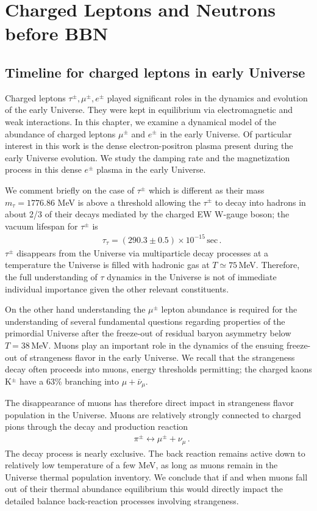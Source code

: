 \section{Charged Leptons and Neutrons before BBN} 
\subsection{Timeline for charged leptons in early Universe}\label{Electron}
Charged leptons $\tau^\pm,\mu^\pm,e^\pm$ played significant roles in the dynamics and evolution of the early Universe. They were kept in equilibrium via electromagnetic and weak interactions.  In this chapter, we examine a dynamical model of the abundance of charged leptons $\mu^\pm$ and $e^\pm$ in the early Universe.  Of particular interest in this work is the dense electron-positron plasma present during the early Universe evolution. We study the damping rate and the magnetization process in this dense $e^\pm$ plasma in the early Universe.

We comment briefly on the case of $\tau^\pm$ which is different as their mass $m_\tau=1776.86$ MeV is above a threshold allowing the $\tau^\pm$ to decay into hadrons in about 2/3 of their decays mediated by the charged EW  W-gauge boson; the vacuum lifespan for $\tau^\pm$ is~\cite{ParticleDataGroup:2022pth}
\begin{align}
&\tau_{\tau}=(290.3\pm0.5)\times10^{-15}\,\mathrm{sec}\,.
\end{align}
$\tau^\pm$ disappears from the Universe via multiparticle decay processes at a temperature the Universe is filled with hadronic gas at $T\simeq 75$\,MeV. Therefore, the full understanding of $\tau$ dynamics in the Universe is not of immediate individual importance given the other relevant constituents.

On the other hand understanding the $\mu^\pm$ lepton abundance is required for the understanding of several fundamental questions regarding properties of the primordial Universe after the freeze-out of residual baryon asymmetry below $T=38$\,MeV. Muons play an important role in the dynamics of the ensuing freeze-out of strangeness flavor in the early Universe. We recall that the strangeness decay often proceeds into muons, energy thresholds permitting;  the charged kaons K$^\pm$ have a 63\% branching into $\mu+\bar \nu_\mu$. 

The disappearance of muons has therefore direct impact in strangeness flavor population in the Universe. Muons are relatively strongly connected to charged pions through the decay and production reaction 
\begin{align}
&\pi^\pm\leftrightarrow \mu^\pm+\nu_\mu\,.
\end{align}
The decay process is nearly exclusive. The back reaction remains active down to relatively low temperature of a few MeV, as long as muons remain in the Universe thermal population inventory.  We conclude that if and when  muons fall out of their thermal abundance equilibrium this would directly impact the detailed balance back-reaction processes involving strangeness.  

